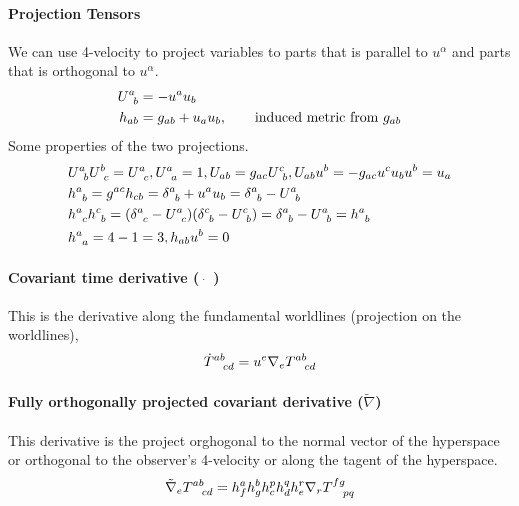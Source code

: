 \documentclass[letterpaper,10pt,english]{sphinxmanual}
\begin{document}
\paragraph{Projection Tensors}
\label{relativity/GeneralRelativity:projection-tensors}
We can use 4-velocity to project variables to parts that is parallel to \(u^\alpha\) and parts that is orthogonal to \(u^\alpha\).
\begin{gather}
\begin{split}U^a_{\phantom a b} &= -u^a u_b \\
h_{ab} &= g_{ab} + u_a u_b, \qquad \text{induced metric from } g _{ab}\end{split}\notag
\end{gather}
Some properties of the  two projections.
\begin{gather}
\begin{split}& U^a_{\phantom a b} U^b_{\phantom bc} = U^a_{\phantom a c}  ,  U^a_{\phantom a a} = 1  , U_{ab}=g_{ac} U^c_{\phantom cb}  , U_{ab} u^b = - g_{ac} u^c u_b u^b = u_a \\
& h^a_{\phantom ab} = g^{ac} h_{cb} = \delta^a_{\phantom ab} + u^a u_b = \delta^a_{\phantom ab} - U^a_{\phantom ab} \\
& h^a_{\phantom a c}h^c_{\phantom c b} = (\delta^a_{\phantom ac} - U^a_{\phantom ac})(\delta^c_{\phantom cb} - U^c_{\phantom cb}) = \delta^a_{\phantom ab} - U^a_{\phantom ab} = h^a_{\phantom ab} \\
& h^a_{\phantom aa} = 4-1 = 3  ,   h_{ab}u^b = 0\end{split}\notag
\end{gather}

\paragraph{Covariant time derivative (\(\dot \quad\))}
\label{relativity/GeneralRelativity:covariant-time-derivative}
This is the derivative along the fundamental worldlines (projection on the worldlines),
\begin{gather}
\begin{split}\dot T^{ab}_{\phantom{ab}cd} = u^e \nabla_e T^{ab}_{\phantom{ab}cd}\end{split}\notag
\end{gather}

\paragraph{Fully orthogonally projected covariant derivative (\(\tilde \nabla\))}
\label{relativity/GeneralRelativity:fully-orthogonally-projected-covariant-derivative}
This derivative is the project orghogonal to the normal vector of the hyperspace or orthogonal to the observer's 4-velocity or along the tagent of the hyperspace.
\begin{gather}
\begin{split}\tilde\nabla_e T^{ab}_{\phantom{ab}cd} = h^a_f h^b_gh^p_ch^q_dh^r_e \nabla_r T^{fg}_{\phantom{fg}pq}\end{split}\notag
\end{gather}
\end{document}
